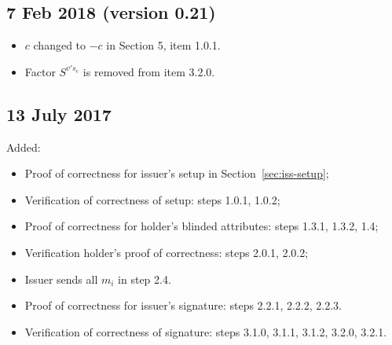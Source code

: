 { \subsection{7 Feb 2018 (version 0.21)}
 \begin{itemize}
 \item $c$ changed to $-c$ in Section 5, item 1.0.1.
 \item Factor $S^{v's_e}$ is removed from item 3.2.0.
 \end{itemize}
 \subsection{13 July 2017}
 Added:
 \begin{itemize}    
 \item Proof of correctness for issuer's setup in Section~\ref{sec:iss-setup};
 \item Verification of correctness of setup: steps 1.0.1, 1.0.2;
 \item Proof of correctness for holder's blinded attributes: steps 1.3.1, 1.3.2, 1.4;
 \item Verification holder's proof of correctness: steps 2.0.1, 2.0.2;
 \item Issuer sends all $m_i$ in step 2.4.
 \item Proof of correctness for issuer's signature: steps 2.2.1, 2.2.2, 2.2.3.
 \item  Verification of correctness of signature: steps 3.1.0, 3.1.1, 3.1.2, 3.2.0, 3.2.1.
 \end{itemize}
 }{}

